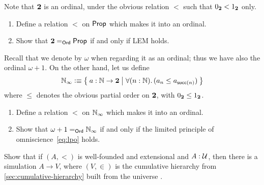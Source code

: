 \begin{ex}\label{ex:prop-ord}
  Note that $\bool$ is an ordinal, under the obvious relation $<$ such that $\bfalse<\btrue$ only.
  \begin{enumerate}
  \item Define a relation $<$ on $\prop$ which makes it into an ordinal.
  \item Show that $\id[\ord]\bool\prop$ if and only if LEM holds.
  \end{enumerate}
\end{ex}

\begin{ex}\label{ex:ninf-ord}
  Recall that we denote \nat by $\omega$ when regarding it as an ordinal; thus we have also the ordinal $\omega+1$.
  On the other hand, let us define
  \[ \nat_\infty \defeq \setof{a:\nat\to\bool | \fall{n:\nat} (a_n \le a_{\suc(n)}) } \]
  where $\le$ denotes the obvious partial order on $\bool$, with $\bfalse\le\btrue$.
  \begin{enumerate}
  \item Define a relation $<$ on $\nat_\infty$ which makes it into an ordinal.
  \item Show that $\id[\ord]{\omega+1}{\nat_\infty}$ if and only if the limited principle of omniscience~\eqref{eq:lpo} holds.
  \end{enumerate}
\end{ex}

\begin{ex}
  Show that if $(A,<)$ is well-founded and extensional and $A:\UU$, then there is a simulation $A\to V$, where $(V,\in)$ is the cumulative hierarchy from \autoref{sec:cumulative-hierarchy} built from the universe \UU.
\end{ex}

